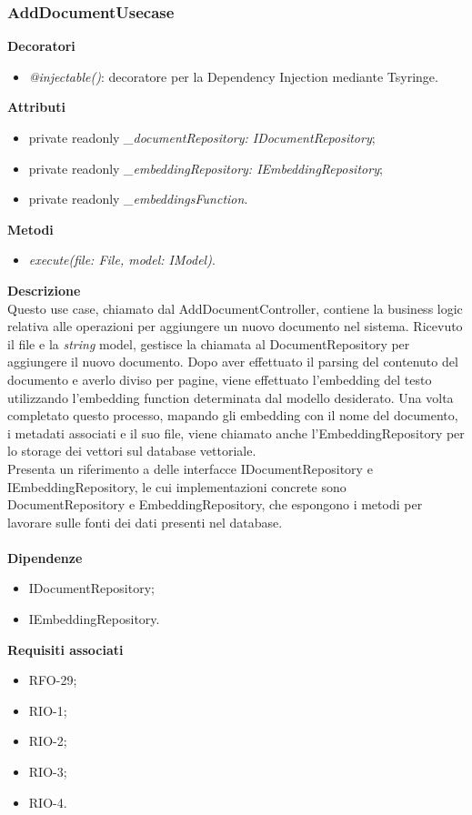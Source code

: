 \subsubsection{AddDocumentUsecase}
\textbf{Decoratori}
\begin{itemize}
    \item \textit{@injectable()}: decoratore per la Dependency Injection mediante Tsyringe.
\end{itemize}
\textbf{Attributi}
\begin{itemize}[itemsep=-4pt]
    \item private readonly \textit{\_documentRepository: IDocumentRepository};
    \item private readonly \textit{\_embeddingRepository: IEmbeddingRepository};
    \item private readonly \textit{\_embeddingsFunction}.
\end{itemize}
\textbf{Metodi}
\begin{itemize}
    \item \textit{execute(file: File, model: IModel)}.
\end{itemize}
\textbf{Descrizione}\\
Questo use case, chiamato dal AddDocumentController, contiene la business logic relativa alle operazioni per aggiungere un nuovo documento nel sistema. Ricevuto il file e la \textit{string} model, gestisce la chiamata al DocumentRepository per aggiungere il nuovo documento. Dopo aver effettuato il parsing del contenuto del documento e averlo diviso per pagine, viene effettuato l'embedding del testo utilizzando l'embedding function determinata dal modello desiderato. Una volta completato questo processo, mapando gli embedding con il nome del documento, i metadati associati e il suo file, viene chiamato anche l'EmbeddingRepository per lo storage dei vettori sul database vettoriale.\\
Presenta un riferimento a delle interfacce IDocumentRepository e IEmbeddingRepository, le cui implementazioni concrete sono DocumentRepository e EmbeddingRepository, che espongono i metodi per lavorare sulle fonti dei dati presenti nel database.\\ \\
\textbf{Dipendenze}
\begin{itemize}[itemsep=-4pt]
    \item IDocumentRepository;
    \item IEmbeddingRepository.
\end{itemize}
\textbf{Requisiti associati}
\begin{itemize}[itemsep=-4pt]
    \item RFO-29;
    \item RIO-1;
    \item RIO-2;
    \item RIO-3;
    \item RIO-4.
\end{itemize}

